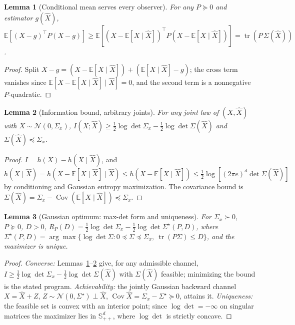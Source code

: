 \documentclass[lettersize,onecolumn]{IEEEtran}
\newtheorem{lemma}{Lemma}
\theoremstyle{definition}
\theoremstyle{remark}
\newcommand{\tr}{\operatorname{tr}}
\newcommand{\E}{\mathbb{E}}
\newcommand{\Cov}{\operatorname{Cov}}
\begin{document}
\begin{lemma}[Conditional mean serves every observer]\label{lem:cm}
For any $P\succeq0$ and estimator $g(\hat X)$, $\E[(X-g)^\top P(X-g)]\ge\E[(X-\E[X\mid
\hat X])^\top P(X-\E[X\mid\hat X])]=\tr(P\,\Sigma(\hat X))$.
\end{lemma}
\begin{proof}
Split $X-g=(X-\E[X\mid\hat X])+(\E[X\mid\hat X]-g)$; the cross term vanishes since
$\E[X-\E[X\mid\hat X]\mid\hat X]=0$, and the second term is a nonnegative $P$-quadratic.
\end{proof}

\begin{lemma}[Information bound, arbitrary joints]\label{lem:info}
For any joint law of $(X,\hat X)$ with $X\sim\mathcal N(0,\Sigma_x)$,
$I(X;\hat X)\ge\tfrac12\log\det\Sigma_x-\tfrac12\log\det\Sigma(\hat X)$ and
$\Sigma(\hat X)\preceq\Sigma_x$.
\end{lemma}
\begin{proof}
$I=h(X)-h(X\mid\hat X)$, and $h(X\mid\hat X)=h(X-\E[X\mid\hat X]\mid\hat X)\le h(X-\E[X
\mid\hat X])\le\tfrac12\log[(2\pi e)^d\det\Sigma(\hat X)]$ by conditioning and Gaussian
entropy maximization. The covariance bound is $\Sigma(\hat X)=\Sigma_x-\Cov(\E[X\mid
\hat X])\preceq\Sigma_x$.
\end{proof}

\begin{lemma}[Gaussian optimum: max-det form and uniqueness]\label{lem:maxdet}
For $\Sigma_x\succ0$, $P\succeq0$, $D>0$,
$R_P(D)=\tfrac12\log\det\Sigma_x-\tfrac12\log\det\Sigma^\star(P,D)$, where
$\Sigma^\star(P,D)=\arg\max\{\log\det\Sigma:0\preceq\Sigma\preceq\Sigma_x,\ \tr(P\Sigma)
\le D\}$, and the maximizer is unique.
\end{lemma}
\begin{proof}
\emph{Converse:} Lemmas~\ref{lem:cm}--\ref{lem:info} give, for any admissible channel,
$I\ge\tfrac12\log\det\Sigma_x-\tfrac12\log\det\Sigma(\hat X)$ with $\Sigma(\hat X)$
feasible; minimizing the bound is the stated program. \emph{Achievability:} the jointly
Gaussian backward channel $X=\hat X+Z$, $Z\sim\mathcal N(0,\Sigma^\star)\perp\hat X$,
$\Cov\hat X=\Sigma_x-\Sigma^\star\succeq0$, attains it. \emph{Uniqueness:} the feasible
set is convex with an interior point; since $\log\det=-\infty$ on singular matrices the
maximizer lies in $\mathbb S^d_{++}$, where $\log\det$ is strictly concave.
\end{proof}
\end{document}
